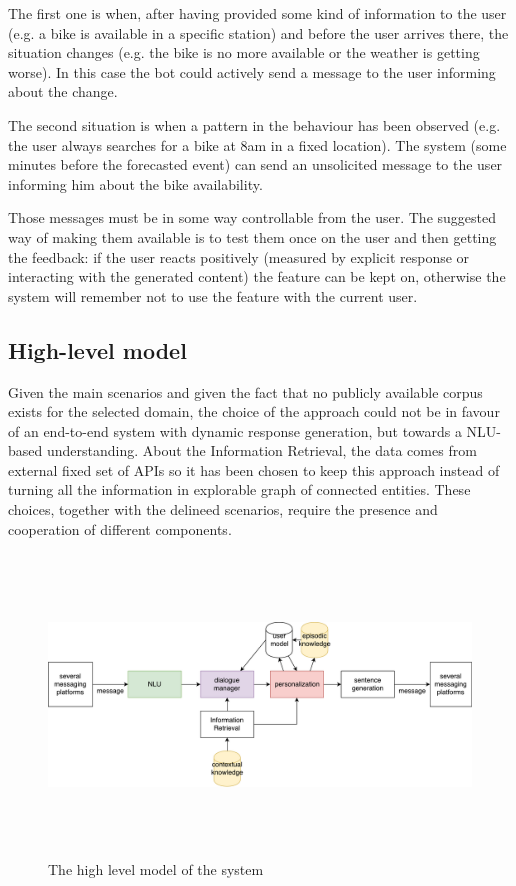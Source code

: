 The first one is when, after having provided some kind of information to the user (e.g. a bike is available in a specific station) and before the user arrives there, the situation changes (e.g. the bike is no more available or the weather is getting worse). In this case the bot could actively send a message to the user informing about the change.

The second situation is when a pattern in the behaviour has been observed (e.g. the user always searches for a bike at 8am in a fixed location). The system (some minutes before the forecasted event) can send an unsolicited message to the user informing him about the bike availability.

Those messages must be in some way controllable from the user. The suggested way of making them available is to test them once on the user and then getting the feedback: if the user reacts positively (measured by explicit response or interacting with the generated content) the feature can be kept on, otherwise the system will remember not to use the feature with the current user.

\subsection{High-level model}
\label{approachModel}

Given the main scenarios and given the fact that no publicly available corpus exists for the selected domain, the choice of the approach could not be in favour of an end-to-end system with dynamic response generation, but towards a NLU-based understanding. About the Information Retrieval, the data comes from external fixed set of APIs so it has been chosen to keep this approach instead of turning all the information in explorable graph of connected entities. These choices, together with the delineed scenarios, require the presence and cooperation of different components.

\begin{figure}[!htb]
    \centering
    \includegraphics[max width=0.9\linewidth,max height=8cm,keepaspectratio]{figures/systemHighLevel}
    \caption{The high level model of the system}\label{fig:systemHighLevel}
\end{figure}

